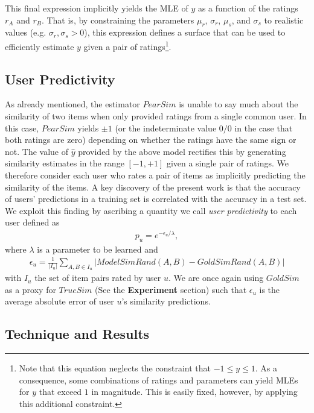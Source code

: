 \documentclass[11pt]{article}
\begin{document}
This final expression implicitly yields the MLE of $y$ as a function of the
ratings $r_A$ and $r_B$. That is, by constraining the parameters $\mu_r$,
$\sigma_r$, $\mu_s$, and $\sigma_s$ to realistic values (e.g. $\sigma_r,
\sigma_s > 0$), this expression defines a surface that can be used to
efficiently estimate $y$ given a pair of ratings\footnote{Note that this
equation neglects the constraint that $-1 \leq y \leq 1$. As a consequence, some
combinations of ratings and parameters can yield MLEs for $y$ that exceed $1$ in
magnitude. This is easily fixed, however, by applying this additional
constraint.}.

\subsection*{User Predictivity}

As already mentioned, the estimator $PearSim$ is unable to say much about the
similarity of two items when only provided ratings from a single common user. In
this case, $PearSim$ yields $\pm1$ (or the indeterminate value $0/0$ in the case
that both ratings are zero) depending on whether the ratings have the same sign
or not. The value of $\hat{y}$ provided by the above model rectifies this by
generating similarity estimates in the range $[-1, +1]$ given a single pair of
ratings. We therefore consider each user who rates a pair of items as implicitly
predicting the similarity of the items. A key discovery of the present work is
that the accuracy of users' predictions in a training set is correlated with the
accuracy in a test set. We exploit this finding by ascribing a quantity we call
{\em user predictivity} to each user defined as
\begin{align}
p_u = e^{-\epsilon_u/\lambda},
\end{align}
where $\lambda$ is a parameter to be learned and
\begin{align}
\epsilon_u = \frac{1}{\left|I_u\right|}
\sum_{A,B \in I_u}{\left|ModelSimRand(A, B) - GoldSimRand(A, B)\right|}
\end{align}
with $I_u$ the set of item pairs rated by user $u$. We are once again using
$GoldSim$ as a proxy for $TrueSim$ (See the {\bf Experiment} section) such that
$\epsilon_u$ is the average absolute error of user $u$'s similarity predictions.

\subsection*{Technique and Results}
\end{document}
